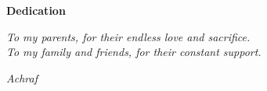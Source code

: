 \clearpage
\thispagestyle{plain}
{}

{\centering\Large\bfseries Dedication\par}
\vspace{1cm}

\vspace*{\fill}
\begin{center}
    \itshape
    To my parents, for their endless love and sacrifice.\\[8pt]
    To my family and friends, for their constant support.
\end{center}
\vspace*{\fill}

\begin{flushright}
    \itshape Achraf
\end{flushright}

\clearpage